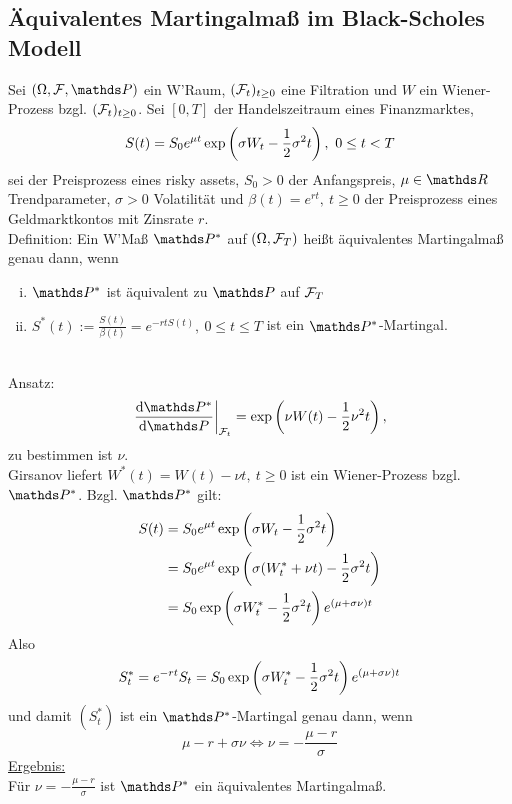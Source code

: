 \subsection{Äquivalentes Martingalmaß im Black-Scholes Modell}
\label{sub:aquiv_martingmass_im_b_s_modell}
Sei $(\Omega,\F,\Pw)$ ein W'Raum, $(\mathcal{F}_t)_{t\ge 0}$ eine Filtration und $W$ ein Wiener-Prozess bzgl. $(\mathcal{F}_t)_{t\ge0}$.
Sei $[0,T]$ der Handelszeitraum eines Finanzmarktes,
\[
S(t)=S_0 e^{\mu t}\exp\left( \sigma W_t-\frac{1}{2}\sigma^2t\right),~0\le t<T
\]
sei der Preisprozess eines risky assets, $S_0>0$ der Anfangspreis, $\mu\in \R$ Trendparameter, $\sigma>0$ Volatilität und $\beta(t)=e^{rt},~t\ge 0$ der Preisprozess eines Geldmarktkontos mit Zinsrate $r$.\\
Definition: Ein W'Maß $\Pw^*$ auf $(\Omega,\mathcal{F}_T)$ heißt äquivalentes Martingalmaß genau dann, wenn
\begin{enumerate}[(i)]
	\item $\Pw^*$ ist äquivalent zu $\Pw$ auf $\mathcal{F}_T$
	\item $S^*(t):=\frac{S(t)}{\beta(t)}=e^{-rtS(t)},~0\le t\le T$ ist ein $\Pw^*$-Martingal.
\end{enumerate}

\\
Ansatz: 
\[
\left.\difff{\Pw^*}{\Pw}\right|_{\F_t}=\exp\enbrace{\nu W(t)-\frac{1}{2}\nu^2t},
\]
zu bestimmen ist $\nu$.\\
Girsanov liefert $W^*(t)=W(t)-\nu t,~t\ge 0$ ist ein Wiener-Prozess bzgl. $\Pw^*$.
Bzgl. $\Pw^*$ gilt:
\begin{equation*}
\begin{aligned}
	S(t)&=S_0 e^{\mu t}\exp\left( \sigma W_t-\frac{1}{2}\sigma^2t\right)\\
	&=S_0 e^{\mu t}\exp\left( \sigma (W_t^*+\nu t)-\frac{1}{2}\sigma^2t\right)\\
	&=S_0 \exp\left( \sigma W_t^*-\frac{1}{2}\sigma^2t\right) e^{(\mu+\sigma \nu)t}
\end{aligned}
\end{equation*}
Also
\[
S_t^*=e^{-rt}S_t=S_0 \exp\left( \sigma W_t^*-\frac{1}{2}\sigma^2t\right) e^{(\mu+\sigma \nu)t}
\]
und damit $(S_t^*)$ ist ein $\Pw^*$-Martingal genau dann, wenn
\[
\mu -r+\sigma \nu \Leftrightarrow \nu = -\frac{\mu-r}{\sigma}
\]
\uline{Ergebnis:}\\
Für $\nu = -\frac{\mu-r}{\sigma}$ ist $\Pw^*$ ein äquivalentes Martingalmaß.\\

